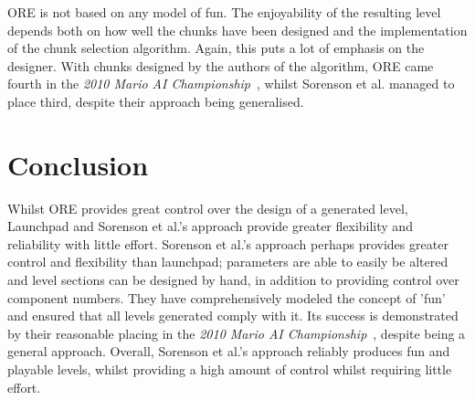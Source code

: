 \documentclass{scrartcl}
\begin{document}
ORE is not based on any model of fun. The enjoyability of the resulting level depends both on how well the chunks have been designed and the implementation of the chunk selection algorithm. Again, this puts a lot of emphasis on the designer. With chunks designed by the authors of the algorithm, ORE came fourth in the \textit{2010 Mario AI Championship}~\cite{shaker:mario}, whilst Sorenson et al. managed to place third, despite their approach being generalised.


\section{Conclusion}
Whilst ORE provides great control over the design of a generated level, Launchpad and Sorenson et al.'s approach provide greater flexibility and reliability with little effort. Sorenson et al.'s approach perhaps provides greater control and flexibility than launchpad; parameters are able to easily be altered and level sections can be designed by hand, in addition to providing control over component numbers. They have comprehensively modeled the concept of 'fun' and ensured that all levels generated comply with it. Its success is demonstrated by their reasonable placing in the \textit{2010 Mario AI Championship}~\cite{shaker:mario}, despite being a general approach. Overall, Sorenson et al.'s approach reliably produces fun and playable levels, whilst providing a high amount of control whilst requiring little effort.



\end{document}

